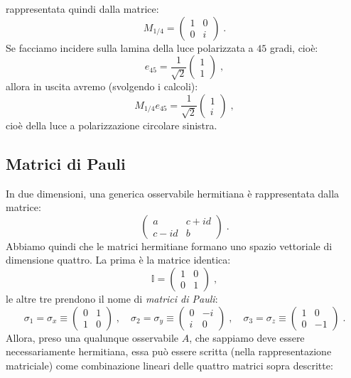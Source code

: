 \documentclass[10pt,a4paper]{report}
\theoremstyle{definition}
\numberwithin{equation}{section}
\begin{document}
rappresentata quindi dalla matrice:
$$
M_{1/4}=\left(
\begin{matrix}
1 & 0 \\
0 & i
\end{matrix}\right)\;.
$$
Se facciamo incidere sulla lamina della luce polarizzata a $45$ gradi, cioè:
$$
e_{45}=\frac{1}{\sqrt{2}}\left(
\begin{matrix}
1 \\
1
\end{matrix}\right)\;,
$$
allora in uscita avremo (svolgendo i calcoli):
$$
M_{1/4}e_{45}=\frac{1}{\sqrt{2}}\left(
\begin{matrix}
1	\\
i
\end{matrix}\right)\;,
$$
cioè della luce a polarizzazione circolare sinistra.
\subsection{Matrici di Pauli}
In due dimensioni, una generica osservabile hermitiana è rappresentata dalla matrice:
$$
\left(\begin{matrix}
a & c+id \\
c-id & b
\end{matrix}\right)\;.
$$
Abbiamo quindi che le matrici hermitiane formano uno spazio vettoriale di dimensione quattro. La prima è la matrice identica:
$$
\mathbb{I}=\left(
\begin{matrix}
1 & 0 \\
0 & 1
\end{matrix}\right)\;,
$$
le altre tre prendono il nome di \textit{matrici di Pauli}:
\begin{equation}
\sigma_1=\sigma_x\equiv \left(
\begin{matrix}
0 & 1 \\
1 & 0
\end{matrix}\right)\;,\quad
\sigma_2=\sigma_y\equiv \left(
\begin{matrix}
0 & -i \\
i & 0
\end{matrix}\right)\;,\quad
\sigma_3=\sigma_z\equiv\left(
\begin{matrix}
1 & 0 \\
0 & -1
\end{matrix}\right)\;.
\end{equation}
Allora, preso una qualunque osservabile $A$, che sappiamo deve essere necessariamente hermitiana, essa può essere scritta (nella rappresentazione matriciale) come combinazione lineari delle quattro matrici sopra descritte:
\end{document}
